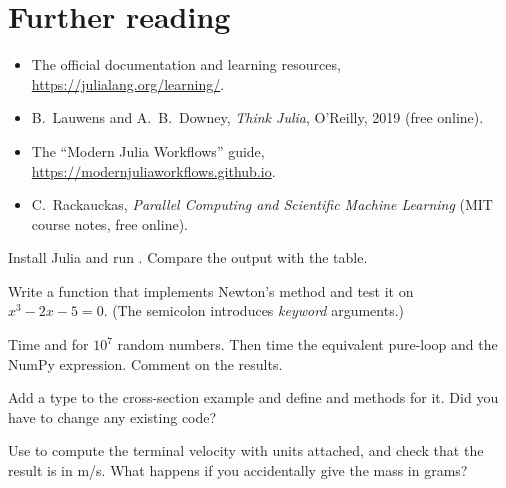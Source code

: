 \section{Further reading}
\begin{itemize}
\item The official documentation and learning resources, \url{https://julialang.org/learning/}.
\item B.~Lauwens and A.~B.~Downey, \emph{Think Julia}, O'Reilly, 2019 (free online).
\item The ``Modern Julia Workflows'' guide, \url{https://modernjuliaworkflows.github.io}.
\item C.~Rackauckas, \emph{Parallel Computing and Scientific Machine Learning} (MIT
  course notes, free online).
\end{itemize}

\begin{exercises}
\item Install Julia and run . Compare the output with the \py table.
\item Write a function  that implements Newton's method
  and test it on $x^3 - 2x - 5 = 0$. (The semicolon introduces \emph{keyword} arguments.)
\item Time  and  for $10^7$ random numbers. Then time
  the equivalent pure-\py loop and the NumPy expression. Comment on the results.
\item Add a  type to the cross-section example and define  and
   methods for it. Did you have to change any existing code?
\item Use  to compute the terminal velocity with units attached, and
  check that the result is in m/s. What happens if you accidentally give the mass in grams?
\end{exercises}
